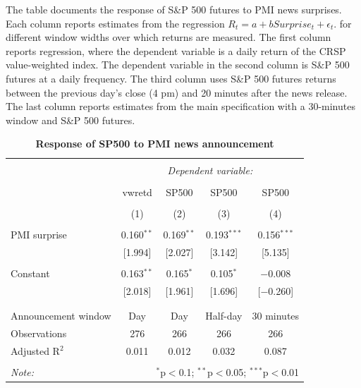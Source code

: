 \documentclass[12pt]{article}
\begin{document}
\begin{table}[!htbp] \centering 
  \caption{\textbf{Response of SP500 to PMI news announcement}} 
  \label{}
  \begin{flushleft}
    {\medskip\small
 The table documents the response of S\&P 500 futures to PMI news surprises. Each column reports estimates from the regression $R_t = a + b Surprise_t + \epsilon_t.$ for different window widths over which returns are measured. The first column reports regression, where the dependent variable is a daily return of the CRSP value-weighted index. The dependent variable in the second column is S\&P 500 futures at a daily frequency. The third column uses S\&P 500 futures returns between the previous day's close (4 pm) and 20 minutes after the news release. The last column reports estimates from the main specification with a 30-minutes window and S\&P 500 futures.}
    \medskip
    \end{flushleft}
\begin{tabular}{@{\extracolsep{5pt}}lcccc} 
\\[-1.8ex]\hline 
\hline \\[-1.8ex] 
 & \multicolumn{4}{c}{\textit{Dependent variable:}} \\ 
\cline{2-5} 
\\[-1.8ex] & vwretd & SP500 & SP500 & SP500 \\ 
\\[-1.8ex] & (1) & (2) & (3) & (4)\\ 
\hline \\[-1.8ex] 
 PMI surprise & 0.160$^{**}$ & 0.169$^{**}$ & 0.193$^{***}$ & 0.156$^{***}$ \\ 
  & [1.994] & [2.027] & [3.142] & [5.135] \\ 
  & & & & \\ 
 Constant & 0.163$^{**}$ & 0.165$^{*}$ & 0.105$^{*}$ & $-$0.008 \\ 
  & [2.018] & [1.961] & [1.696] & [$-$0.260] \\ 
  & & & & \\ 
\hline \\[-1.8ex] 
Announcement window & Day & Day & Half-day & 30 minutes \\ 
Observations & 276 & 266 & 266 & 266 \\ 
Adjusted R$^{2}$ & 0.011 & 0.012 & 0.032 & 0.087 \\ 
\hline 
\hline \\[-1.8ex] 
\textit{Note:}  & \multicolumn{4}{r}{$^{*}$p$<$0.1; $^{**}$p$<$0.05; $^{***}$p$<$0.01} \\ 
\end{tabular} 
\end{table}
\end{document}
